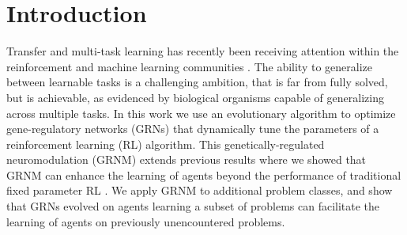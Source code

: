 \section{Introduction}

Transfer and multi-task learning has recently been receiving attention within the reinforcement and machine learning communities \cite{Li2009,Taylor2009}. The ability to generalize between learnable tasks is a challenging ambition, that is far from fully solved, but is achievable, as evidenced by biological organisms capable of generalizing across multiple tasks. In this work we use an evolutionary algorithm to optimize gene-regulatory networks (GRNs) that dynamically tune the parameters of a reinforcement learning (RL) algorithm. This genetically-regulated neuromodulation (GRNM) extends previous results where we showed that GRNM can enhance the learning of agents beyond the performance of traditional fixed parameter RL \cite{Harrington2013}. We apply GRNM to additional problem classes, and show that GRNs evolved on agents learning a subset of problems can facilitate the learning of agents on previously unencountered problems. 
